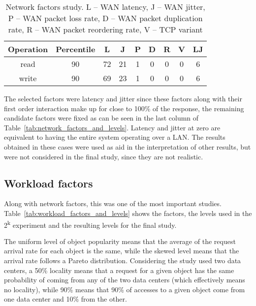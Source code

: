 \documentclass[man,floatsintext,12pt]{apa6}
\begin{document}
\begin{table}[h!]
\caption{Network factors study. L -- WAN latency, J -- WAN jitter, P -- WAN
packet loss rate, D -- WAN packet duplication rate, R -- WAN packet reordering
rate, V -- TCP variant}
\begin{tabular}{ccccccccc} \toprule

Operation & Percentile & L & J & P & D & R & V & LJ\\ \midrule

read & 90 & 72 & 21 & 1 & 0 & 0 & 0 & 6\\

write & 90 & 69 & 23 & 1 & 0 & 0 & 0 & 6\\ \bottomrule

\end{tabular}
\label{tab:estudo_para_fatores_de_rede}

\end{table}

The selected factors were latency and jitter since these factors along with
their first order interaction make up for close to 100\% of the response, the
remaining candidate factors were fixed as can be seen in the last column of
Table~\ref{tab:network_factors_and_levels}. Latency and jitter at zero are
equivalent to having the entire system operating over a LAN. The results
obtained in these cases were used as aid in the interpretation of other
results, but were not considered in the final study, since they are not
realistic.

\subsection{Workload factors}

Along with network factors, this was one of the most important studies.
Table~\ref{tab:workload_factors_and_levels} shows the factors, the levels used
in the 2\textsuperscript{k} experiment and the resulting levels for the final
study.

The uniform level of object popularity means that the average of the request
arrival rate for each object is the same, while the skewed level means that the
arrival rate follows a Pareto distribution. Considering the study used two data
centers, a 50\% locality means that a request for a given object has the same
probability of coming from any of the two data centers (which effectively means
no locality), while 90\% means that 90\% of accesses to a given object come
from one data center and 10\% from the other.
\end{document}
